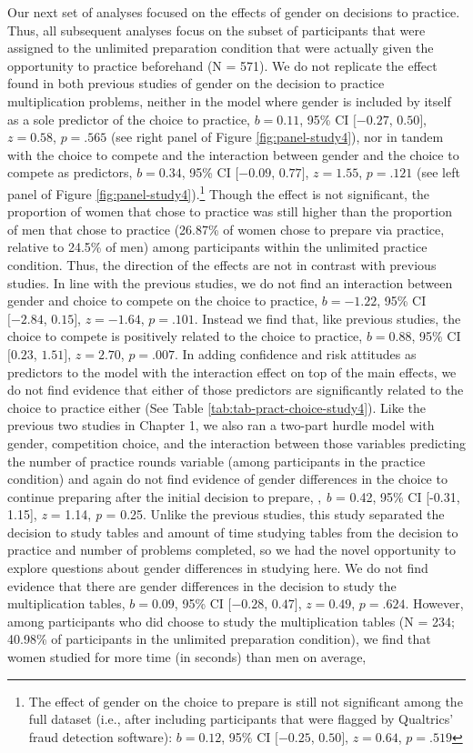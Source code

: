 \documentclass[letterpaper, nobind]{templates/ociamthesis}
\begin{document}
Our next set of analyses focused on the effects of gender on decisions to practice. Thus, all subsequent analyses focus on the subset of participants that were assigned to the unlimited preparation condition that were actually given the opportunity to practice beforehand (N = 571). We do not replicate the effect found in both previous studies of gender on the decision to practice multiplication problems, neither in the model where gender is included by itself as a sole predictor of the choice to practice, \(b = 0.11\), 95\% CI \([-0.27\), \(0.50]\), \(z = 0.58\), \(p = .565\) (see right panel of Figure \ref{fig:panel-study4}), nor in tandem with the choice to compete and the interaction between gender and the choice to compete as predictors, \(b = 0.34\), 95\% CI \([-0.09\), \(0.77]\), \(z = 1.55\), \(p = .121\) (see left panel of Figure \ref{fig:panel-study4}).\footnote{The effect of gender on the choice to prepare is still not significant among the full dataset (i.e., after including participants that were flagged by Qualtrics' fraud detection software): \(b = 0.12\), 95\% CI \([-0.25\), \(0.50]\), \(z = 0.64\), \(p = .519\)} Though the effect is not significant, the proportion of women that chose to practice was still higher than the proportion of men that chose to practice (26.87\% of women chose to prepare via practice, relative to 24.5\% of men) among participants within the unlimited practice condition. Thus, the direction of the effects are not in contrast with previous studies. In line with the previous studies, we do not find an interaction between gender and choice to compete on the choice to practice, \(b = -1.22\), 95\% CI \([-2.84\), \(0.15]\), \(z = -1.64\), \(p = .101\). Instead we find that, like previous studies, the choice to compete is positively related to the choice to practice, \(b = 0.88\), 95\% CI \([0.23\), \(1.51]\), \(z = 2.70\), \(p = .007\). In adding confidence and risk attitudes as predictors to the model with the interaction effect on top of the main effects, we do not find evidence that either of those predictors are significantly related to the choice to practice either (See Table \ref{tab:tab-pract-choice-study4}). Like the previous two studies in Chapter 1, we also ran a two-part hurdle model with gender, competition choice, and the interaction between those variables predicting the number of practice rounds variable (among participants in the practice condition) and again do not find evidence of gender differences in the choice to continue preparing after the initial decision to prepare, , \emph{b} = 0.42, 95\% CI {[}-0.31, 1.15{]}, \emph{z} = 1.14, \emph{p} = 0.25. Unlike the previous studies, this study separated the decision to study tables and amount of time studying tables from the decision to practice and number of problems completed, so we had the novel opportunity to explore questions about gender differences in studying here. We do not find evidence that there are gender differences in the decision to study the multiplication tables, \(b = 0.09\), 95\% CI \([-0.28\), \(0.47]\), \(z = 0.49\), \(p = .624\). However, among participants who did choose to study the multiplication tables (N = 234; 40.98\% of participants in the unlimited preparation condition), we find that women studied for more time (in seconds) than men on average, 
\end{document}
